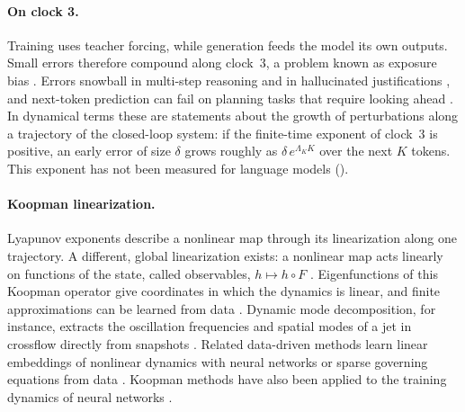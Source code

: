 \paragraph{On clock 3.} Training uses teacher forcing, while generation feeds the model its own outputs. Small errors therefore compound along clock~3, a problem known as exposure bias \citep{bengio2015scheduled,wang2020exposure}. Errors snowball in multi-step reasoning \citep{dziri2023faith} and in hallucinated justifications \citep{zhang2023language}, and next-token prediction can fail on planning tasks that require looking ahead \citep{bachmann2024pitfalls}. In dynamical terms these are statements about the growth of perturbations along a trajectory of the closed-loop system: if the finite-time exponent of clock~3 is positive, an early error of size $\delta$ grows roughly as $\delta\,e^{\Lambda_K K}$ over the next $K$ tokens. This exponent has not been measured for language models ().

\paragraph{Koopman linearization.} Lyapunov exponents describe a nonlinear map through its linearization along one trajectory. A different, global linearization exists: a nonlinear map acts linearly on functions of the state, called observables, $h\mapsto h\circ F$ \citep{koopman1931hamiltonian}. Eigenfunctions of this Koopman operator give coordinates in which the dynamics is linear, and finite approximations can be learned from data \citep{mezic2005spectral}. Dynamic mode decomposition, for instance, extracts the oscillation frequencies and spatial modes of a jet in crossflow directly from snapshots \citep{rowley2009spectral}. Related data-driven methods learn linear embeddings of nonlinear dynamics with neural networks \citep{lusch2017deep} or sparse governing equations from data \citep{brunton2015discovering}. Koopman methods have also been applied to the training dynamics of neural networks \citep{dogra2020optimizing,redman2021operator}.

